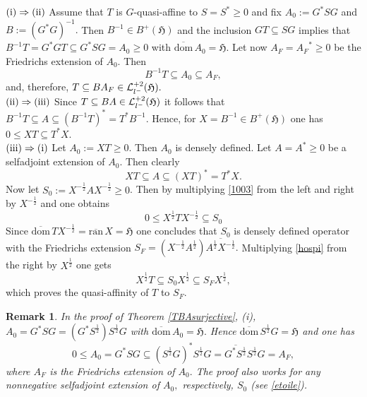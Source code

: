 \documentclass{amsart}
\makeatletter
\newtheorem{remark}[theorem]{Remark}
\newcommand{\h}{\mathfrak{H}}
\newcommand{\ranbar}{\overline{\mathrm{ran}}\,}
\newcommand{\dombar}{\overline{\mathrm{dom}}\,}%
\newcommand{\adj}{^*}
\newcommand{\inv}{^{-1}}
\newcommand{\tstar}{T^{*}}
\newcommand{\half}{^{\frac{1}{2}}}
\newcommand{\mhalf}{^{-\frac{1}{2}}}
\newcommand{\inclu}{\subseteq}
\newcommand{\lplus}{B^{+}(\h)}
\newcommand{\lldeux}{\mathcal{L}_{{l}^{\tiny-}}^{+2}(\h)}
\numberwithin{equation}{section}
\renewenvironment{proof}[1][\proofname]{%
   \par\pushQED{\qed}\normalfont%
   \topsep6\p@\@plus6\p@\relax
   \trivlist\item[\hskip\labelsep\bfseries#1\@addpunct{.}]%
   \ignorespaces
}{%
   \popQED\endtrivlist\@endpefalse
}
\makeatother
\begin{document}
\begin{proof}
    $   \rm (i)\Rightarrow  (ii)$ Assume   that $T$ is $G$-quasi-affine to $S= S\adj \geq 0$ and  fix         $A_0:=  G\adj SG $ and $B:= ( G\adj G)\inv .$  Then $B\inv \in \lplus $ and   the inclusion $G T \inclu S G$ implies that $ B\inv T =G\adj G T   \inclu G \adj  S G =A_0 \geq 0 $ with $ \dombar A_0 =\h.$   Let now   $A_F = {A_F}\adj \geq 0$ be the Friedrichs extension of $A_0.$   Then
      \begin{equation}\label{dima}
        B\inv T \inclu  A_0 \inclu A_F,
      \end{equation}
     and, therefore, $ T  \inclu B A_F \in \lldeux.$ \\
        \hspace*{0.4cm} $\rm (ii) \Rightarrow (iii)$  Since $T \inclu BA \in \lldeux$ it follows that $ B\inv T \inclu A \inclu (B\inv T)\adj= \tstar B\inv.$ Hence, for $X=  B\inv \in \lplus$ one has
        $   0 \leq X T  \inclu  \tstar X.$\\
      \hspace*{0.4cm} $\rm (iii) \Rightarrow (i)$ Let $A_0 := XT \geq 0.$ Then $A_0$ is densely defined. Let $A= A\adj \geq 0$  be a selfadjoint extension of $A_0$. Then clearly
     \begin{equation}\label{1003}
        XT \inclu A \inclu (XT)\adj = \tstar X.
       \end{equation}
       Now let $S_0:= X\mhalf A X\mhalf \geq 0$. Then by multiplying  \eqref{1003}  from the left  and right by $X\mhalf$ and   one obtains
      \begin{equation}\label{hospi}
     0 \leq   X\half T X\mhalf    \inclu  S_0  
        \end{equation}
      Since $\dombar T X\mhalf = \ranbar X = \h$ one concludes that $S_0$ is densely defined operator with the  Friedrichs extension $S_F=  (X\mhalf {A}\half) \overline{{A}\half X\mhalf} .$  Multiplying \eqref{hospi} from the right by $X\half$ one gets
        \begin{equation}\label{etoile}
             X\half T      \inclu S_0 X\half \inclu S_F X\half,
        \end{equation}
       which proves the quasi-affinity of $T$ to $S_F.$
        \end{proof}


\begin{remark} \label{e5rrem} \normalfont
In  the proof of Theorem \ref{TBAsurjective}, \rm(i),   $ A_0 = G\adj S G  = (G\adj S\half) S\half G$ with    $\dombar A_0= \h.$ Hence     $\dombar S\half G =\h$ and one has
\begin{equation}\label{nchlh}
 0 \leq A_0 = G\adj S G  \inclu (S\half G)\adj S\half G = \overline{ G\adj S\half } S\half G= A_F,
\end{equation}
where $A_F$ is the Friedrichs extension of $A_0.$  The proof also works for any    nonnegative selfadjoint extension of $A_0,$  respectively,  $S_0$ (see \eqref{etoile}).
\end{remark}
\end{document}
